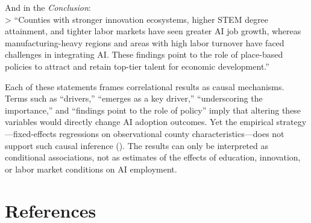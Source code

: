 \documentclass[
]{article}
\begin{document}
And in the \emph{Conclusion}:\\
\textgreater{} ``Counties with stronger innovation ecosystems, higher
STEM degree attainment, and tighter labor markets have seen greater AI
job growth, whereas manufacturing-heavy regions and areas with high
labor turnover have faced challenges in integrating AI. These findings
point to the role of place-based policies to attract and retain top-tier
talent for economic development.''

Each of these statements frames correlational results as causal
mechanisms. Terms such as ``drivers,'' ``emerges as a key driver,''
``underscoring the importance,'' and ``findings point to the role of
policy'' imply that altering these variables would directly change AI
adoption outcomes. Yet the empirical strategy---fixed-effects
regressions on observational county characteristics---does not support
such causal inference (). The
results can only be interpreted as conditional associations, not as
estimates of the effects of education, innovation, or labor market
conditions on AI employment.

\section*{References}\label{references}
\end{document}

